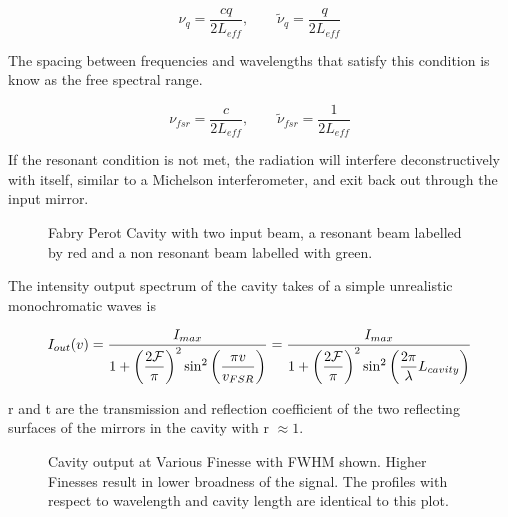 \documentclass[11pt,a4paper]{book}
\newcommand{\imginput}[1]{} %
\begin{document}
		\begin{equation}\label{eq:resonantfreq}
			\nu_q=\dfrac{cq}{2L_{eff}}, \qquad \tilde{\nu}_q=\dfrac{q}{2L_{eff}}
		\end{equation}
		
		The spacing between frequencies and wavelengths that satisfy this condition is know as the free spectral range.
		
		\begin{equation}\label{eq:FSR}
			\nu_{fsr}=\dfrac{c}{2L_{eff}}, \qquad \tilde{\nu}_{fsr}=\dfrac{1}{2L_{eff}}
		\end{equation}	
		
		If the resonant condition is not met, the radiation will interfere deconstructively with itself, similar to a Michelson interferometer, and exit back out through the input mirror.			
		
		\begin{figure} 
			\centering
			\def\svgwidth{\columnwidth}
			\resizebox{160mm}{!}{\imginput{images/feb-per-cav.pdf_tex}}
			\caption{Fabry Perot Cavity with two input beam, a resonant beam labelled by red and a non resonant beam labelled with green.}
			\label{fig:feb-per-cav}
		\end{figure}
		
		The intensity output spectrum of the cavity takes of a simple unrealistic monochromatic waves is
		
		\begin{equation} \label{eq:res}
			\centering
			{I_{out} (v)}=\dfrac{I_{max}}{1+\bigg(\dfrac{2\mathcal{F}}{\pi}\bigg)^2 \sin^2\bigg({\dfrac{\pi v}{v_{FSR}}}\bigg)}=\dfrac{I_{max}}{1+\left(\dfrac{2\mathcal{F}}{\pi}\right)^2 \sin^2\left({ \dfrac{2\pi}{\lambda}} L_{cavity}\right)}
		\end{equation}
		
		r and t are the transmission and reflection coefficient of the two reflecting surfaces of the mirrors in the cavity with r $\approx 1$.
		
		\begin{figure} [!ht]
			\centering
			\def\svgwidth{\columnwidth}
			\resizebox{160mm}{!}{\imginput{images/cav-res-profiles.pdf_tex}}
			\caption{\cite{steck}Cavity output at Various Finesse with FWHM shown. Higher Finesses result in lower broadness of the signal. The profiles with respect to wavelength and cavity length are identical to this plot. }
			\label{fig:cav-res-profiles}
		\end{figure}			

\end{document}
